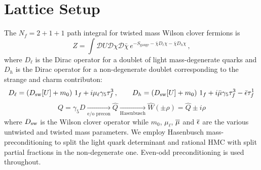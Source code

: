 \documentclass[a4paper,11pt]{article}
\begin{document}
\section{Lattice Setup}
    The $N_f =2+1+1$ path integral for twisted mass Wilson clover fermions \cite{Frezzotti:2003ni,Frezzotti:2004wz,Sheikholeslami:1985ij} is
    \begin{equation*}
      Z= \int \mathcal{D}U \mathcal{D}\chi \mathcal{D}\bar\chi \,e^{-S_\mathrm{gauge}-\bar \chi D_\ell\chi - \bar \chi D_h \chi } \,,
    \end{equation*}
    where $D_\ell$ is the Dirac operator for a doublet of light mass-degenerate quarks and $D_h$ is the Dirac operator for a non-degenerate doublet corresponding to the strange and charm contributon:
    \begin{equation*}
        D_\ell = (D_{\mathrm{sw}}[U] + m_0)\ 1_f + i \mu_\ell\gamma_5\tau^3_f\, ,\quad\quad
        D_h = (D_{\mathrm{sw}}[U] + m_0)\ 1_f + i\bar\mu\gamma_5\tau^3_f - \bar\epsilon \tau^1_f
    \end{equation*}
    \begin{equation*}
        Q = \gamma_5 D \underset{\text{e/o precon}}{\rightarrow} \hat{Q} \underset{\text{Hasenbusch}}{\rightarrow} \hat{W}(\pm\rho) = \hat{Q} \pm i\rho
    \end{equation*}
    where $D_{\mathrm{sw}}$ is the Wilson clover operator while $m_0$, $\mu_\ell$, $\overline{\mu}$ and $\overline{\epsilon}$ are the various untwisted and twisted mass parameters.
    We employ Hasenbusch mass-preconditioning \cite{Hasenbusch:2001ne} to split the light quark determinant and rational HMC \cite{Clark:2006fx} with split partial fractions in the non-degenerate one. Even-odd preconditioning is used throughout.
\end{document}
